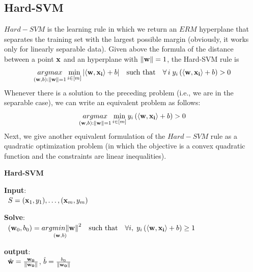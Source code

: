 \documentclass[12pt]{report}
\theoremstyle{plain}
\newcommand\sprod[2]{\langle \vb{#1},\vb{#2}\rangle}
\begin{document}
\begin{flushleft}
\section{Hard-SVM}
$Hard-SVM$ is the learning rule in which we return an $ERM$ hyperplane that separates the training set with the largest possible margin (obviously, it works only for linearly separable data). Given above the formula of the distance between a point $\vb{x}$ and an hyperplane with $\norm{\vb{w}}=1$, the Hard-SVM rule is
\[ \underset{(\vb{w},b):\norm{\vb{w}}=1}{argmax} \min_{i\in[m]}\abs{\sprod{w}{x_i}+b} \quad\text{such that}\quad \forall\,i\; y_i\left(\sprod{w}{x_i}+b\right)>0 \]
Whenever there is a solution to the preceding problem (i.e., we are in the separable case), we can write an equivalent problem as follows:
\begin{equation}
\underset{(\vb{w},b):\norm{\vb{w}}=1}{argmax} \min_{i\in[m]} y_i\left(\sprod{w}{x_i}+b\right)>0
\label{eq:SVM}
\end{equation}
Next, we give another equivalent formulation of the $Hard-SVM$ rule as a quadratic optimization problem (in which the objective is a convex quadratic function and the constraints are linear inequalities).
\begin{tcolorbox}
	\begin{center}
		\textbf{Hard-SVM}
	\end{center}
	\textbf{Input}:\\
	\-\ \qquad $S=(\vb{x}_1,y_1),\dots,(\vb{x}_m,y_m)$
	
	\textbf{Solve}:\\
	\-\ \qquad $(\vb{w}_0,b_0) = \underset{(\vb{w},b)}{argmin\norm{\vb{w}}}^2\quad\text{such that}\quad\forall i,\; y_i\left(\sprod{w}{x_i}+b\right)\geq 1$
	
	\textbf{output}:\\
	\-\ \qquad $\hat{\vb{w}}=\frac{\vb{w_0}}{\norm{\vb{w_0}}}$, $\hat{b} = \frac{b_0}{\norm{\vb{w_0}}}$
	

\end{tcolorbox}
\end{flushleft}
\end{document}
